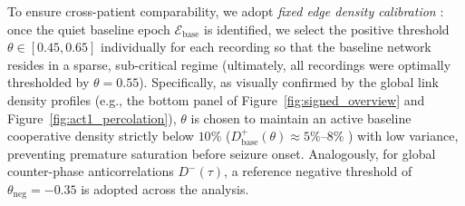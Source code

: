 To ensure cross-patient comparability, we adopt \textit{fixed edge density calibration} \cite{vanwijk2010comparing}: once the quiet baseline epoch $\mathcal{E}_{\text{base}}$ is identified, we select the positive threshold $\theta \in [0.45, 0.65]$ individually for each recording so that the baseline network resides in a sparse, sub-critical regime (ultimately, all recordings were optimally thresholded by $\theta = 0.55$). Specifically, as visually confirmed by the global link density profiles (e.g., the bottom panel of Figure~\ref{fig:signed_overview} and Figure~\ref{fig:act1_percolation}), $\theta$ is chosen to maintain an active baseline cooperative density strictly below $10\%$ ($D^{+}_{\text{base}}(\theta) \approx 5\%\text{--}8\%$ \cite{bullmore2009complex}) with low variance, preventing premature saturation before seizure onset. Analogously, for global counter-phase anticorrelations $D^{-}(\tau)$, a reference negative threshold of $\theta_{\text{neg}} = -0.35$ is adopted across the analysis.